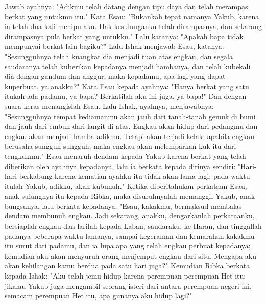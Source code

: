 \begin{biblechapter}
\verse Jawab ayahnya: "Adikmu telah datang dengan tipu daya dan telah merampas berkat yang untukmu itu."
\verse Kata Esau: "Bukankah tepat namanya Yakub, karena ia telah dua kali menipu aku. Hak kesulunganku telah dirampasnya, dan sekarang dirampasnya pula berkat yang untukku." Lalu katanya: "Apakah bapa tidak mempunyai berkat lain bagiku?"
\verse Lalu Ishak menjawab Esau, katanya: "Sesungguhnya telah kuangkat dia menjadi tuan atas engkau, dan segala saudaranya telah kuberikan kepadanya menjadi hambanya, dan telah kubekali dia dengan gandum dan anggur; maka kepadamu, apa lagi yang dapat kuperbuat, ya anakku?"
\verse Kata Esau kepada ayahnya: "Hanya berkat yang satu itukah ada padamu, ya bapa? Berkatilah aku ini juga, ya bapa!" Dan dengan suara keras menangislah Esau.
\verse Lalu Ishak, ayahnya, menjawabnya: "Sesungguhnya tempat kediamanmu akan jauh dari tanah-tanah gemuk di bumi dan jauh dari embun dari langit di atas.
\verse Engkau akan hidup dari pedangmu dan engkau akan menjadi hamba adikmu. Tetapi akan terjadi kelak, apabila engkau berusaha sungguh-sungguh, maka engkau akan melemparkan kuk itu dari tengkukmu."
 Esau menaruh dendam kepada Yakub karena berkat yang telah diberikan oleh ayahnya kepadanya, lalu ia berkata kepada dirinya sendiri: "Hari-hari berkabung karena kematian ayahku itu tidak akan lama lagi; pada waktu itulah Yakub, adikku, akan kubunuh."
\verse Ketika diberitahukan perkataan Esau, anak sulungnya itu kepada Ribka, maka disuruhnyalah memanggil Yakub, anak bungsunya, lalu berkata kepadanya: "Esau, kakakmu, bermaksud membalas dendam membunuh engkau.
\verse Jadi sekarang, anakku, dengarkanlah perkataanku, bersiaplah engkau dan larilah kepada Laban, saudaraku, ke Haran,
\verse dan tinggallah padanya beberapa waktu lamanya, sampai kegeraman
\verse dan kemarahan kakakmu itu surut dari padamu, dan ia lupa apa yang telah engkau perbuat kepadanya; kemudian aku akan menyuruh orang menjemput engkau dari situ. Mengapa aku akan kehilangan kamu berdua pada satu hari juga?"
\verse Kemudian Ribka berkata kepada Ishak: "Aku telah jemu hidup karena perempuan-perempuan Het itu; jikalau Yakub juga mengambil seorang isteri dari antara perempuan negeri ini, semacam perempuan Het itu, apa gunanya aku hidup lagi?"
\end{biblechapter}

